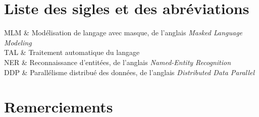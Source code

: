 \documentclass[12pt,twoside,maitrise]{dms}
\theoremstyle{definition}
\numberwithin{equation}{section}
\numberwithin{table}{chapter}
\numberwithin{figure}{chapter}
\begin{document}

\chapter*{Liste des sigles et des abréviations}
\begin{twocolumnlist}{.2\textwidth}{.7\textwidth}
	MLM & Modélisation de langage avec masque, de l'anglais
	\textit{Masked Language Modeling}\\
	TAL & Traitement automatique du langage\\
	NER & Reconnaissance d'entitées, de l'anglais
	\textit{Named-Entity Recognition}\\
	DDP & Parallélisme distribué des données, de l'anglais
	\textit{Distributed Data Parallel}\\
\end{twocolumnlist}


\chapter*{Remerciements}
\end{document}
